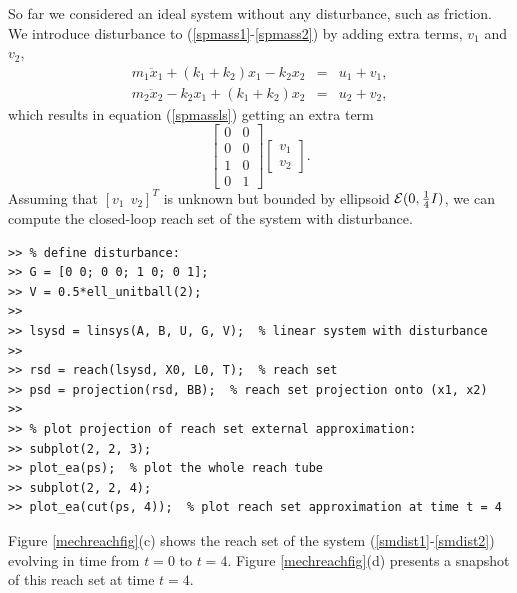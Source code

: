 So far we considered an ideal system without any disturbance, such as friction.
We introduce disturbance to (\ref{spmass1}-\ref{spmass2}) by adding extra
terms, $v_1$ and $v_2$,
\begin{eqnarray}
m_1\ddot{x}_1+(k_1+k_2)x_1-k_2x_2 & = & u_1 + v_1, \label{smdist1}\\
m_2\ddot{x}_2-k_2x_1+(k_1+k_2)x_2 & = & u_2 + v_2, \label{smdist2}
\end{eqnarray}
which results in equation (\ref{spmassls}) getting an extra term
\[ \left[\begin{array}{cc}
0 & 0\\
0 & 0\\
1 & 0\\
0 & 1\end{array}\right]\left[\begin{array}{c}
v_1\\
v_2\end{array}\right]. \]
Assuming that $[v_1 ~~ v_2]^T$ is unknown but bounded by ellipsoid
$\EE(0, \frac{1}{4}I)$, we can compute the closed-loop reach set of the system
with disturbance.
{\tt \begin{verbatim}
>> % define disturbance:
>> G = [0 0; 0 0; 1 0; 0 1];
>> V = 0.5*ell_unitball(2);
>>
>> lsysd = linsys(A, B, U, G, V);  % linear system with disturbance
>>
>> rsd = reach(lsysd, X0, L0, T);  % reach set
>> psd = projection(rsd, BB);  % reach set projection onto (x1, x2)
>>
>> % plot projection of reach set external approximation:
>> subplot(2, 2, 3);
>> plot_ea(ps);  % plot the whole reach tube
>> subplot(2, 2, 4);
>> plot_ea(cut(ps, 4));  % plot reach set approximation at time t = 4
\end{verbatim}}
Figure \ref{mechreachfig}(c) shows the reach set of the system
(\ref{smdist1}-\ref{smdist2}) evolving in time from $t=0$ to $t=4$.
Figure \ref{mechreachfig}(d) presents a snapshot of this reach set at time
$t=4$.



